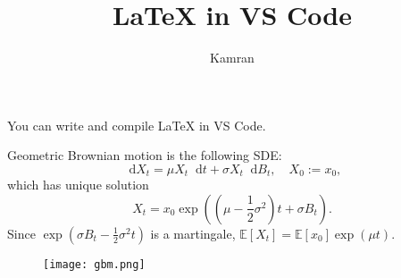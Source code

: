 \documentclass{article}
\title{LaTeX in VS Code}
\author{Kamran}
\renewcommand\brack[1]{\left (#1\right)}
\newcommand\sbrack[1]{\left [ #1 \right ]}
\newcommand{\dd}{\mathop{}\!\mathrm{d}}
\newcommand{\bbE}{\mathbb{E}}
\newcommand\E[1]{\bbE\sbrack{#1}}
\begin{document}
    \maketitle
    
    You can write and compile LaTeX in VS Code.

    Geometric Brownian motion is the following SDE:
    $$
    \dd X_t = \mu X_t \dd t + \sigma X_t \dd B_t, \quad X_0 := x_0,
    $$
    which has unique solution
    $$
    X_t = x_0 \exp \brack{\brack{\mu - \frac{1}{2}\sigma^2}t + \sigma B_t}.
    $$
    Since $\exp\brack{\sigma B_t - \frac{1}{2}\sigma^2 t}$ is a martingale, $\E{X_t} = \E{x_0}\exp(\mu t)$.

    \begin{figure}[!h]
        \centering
        \texttt{[image: gbm.png]}
        \label{fig:gbm}
    \end{figure}
\end{document}
